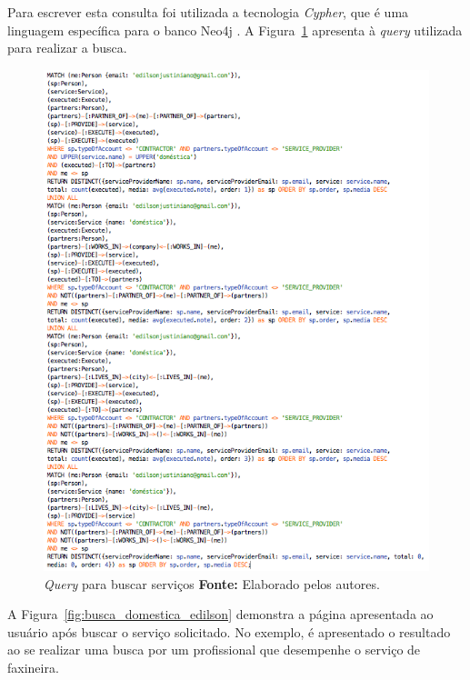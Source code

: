 \par Para escrever esta consulta foi utilizada a tecnologia \textit{Cypher}, que é uma linguagem específica para o banco Neo4j \cite{neo4j_team_manual}. A Figura~\ref{fig:consulta_busca} apresenta à \textit{query} utilizada para realizar a busca.

\begin{figure}[h!]
	\centerline{\includegraphics[scale=0.7]{./imagens/consulta-busca-domestica.png}}
	\caption[\textit{Query} para buscar serviços.]
	{\textit{Query} para buscar serviços \textbf{Fonte:} Elaborado pelos autores.}
	\label{fig:consulta_busca}
\end{figure}



\par A Figura~\ref{fig:busca_domestica_edilson} demonstra a página apresentada ao usuário após buscar o serviço solicitado. No exemplo, é apresentado o resultado ao se realizar uma busca por um profissional que desempenhe o serviço de faxineira.

